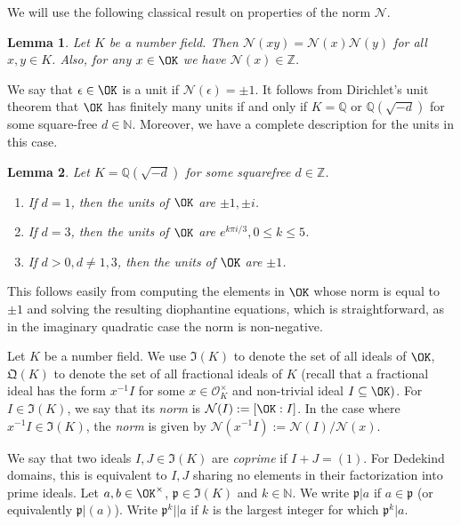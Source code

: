 \documentclass[11pt]{amsart}
\newtheorem{lemma}{Lemma}[section]
\theoremstyle{definition}
\newcommand{\N}{{\mathbb N}}
\newcommand{\NN}{{\mathcal N}}
\newcommand{\Q}{{\mathbb Q}}
\newcommand{\Z}{{\mathbb Z}}
\newcommand{\mf}{\mathfrak}
\newcommand{\e}{\epsilon}
\begin{document}
We will use the following classical result on properties of the norm $\NN$.

\begin{lemma}
    Let $K$ be a number field. Then $\NN(xy)=\NN(x)\NN(y)$ for all $x,y\in K$. Also, for any $x \in \OK$ we have $\NN(x)\in\Z$.
\end{lemma}

We say that $\e\in \OK$ is a unit if $\NN(\e)=\pm 1$. 
It follows from Dirichlet's unit theorem \cite[Theorem~8.1]{neukirch99} that $\OK$ has finitely many units if and only if $K=\Q$ or $\Q(\sqrt{-d})$ for some square-free $d\in\N$. Moreover, 
we have a complete description for the units in this case.

\begin{lemma}\label{l32}
    Let $K=\Q(\sqrt{-d})$ for some squarefree $d\in\Z$. 
    \begin{enumerate}
        \item If $d=1$, then the units of $\OK$ are $\pm 1, \pm i$.
        \item If $d=3$, then the units of $\OK$ are $e^{k\pi i/3}, 0\leq k\leq 5$.
        \item If $d>0, d\neq 1,3$, then the units of $\OK$ are $\pm 1$.
    \end{enumerate}
\end{lemma}
This follows easily from computing the elements in $\OK$ whose norm is equal to $\pm 1$ and solving the resulting diophantine equations, which is straightforward, as in the imaginary quadratic case the norm is non-negative. 


 

Let $K$ be a number field. We use $\mathfrak{I}(K)$ to denote the set of all  ideals of $\OK$, $\mathfrak{Q}(K)$ to denote the set of all fractional ideals of $K$ (recall that a fractional ideal has the form $x^{-1}I$ for some $x \in \mathcal{O}_K^{\times}$ and non-trivial ideal $I \subseteq \OK)$. %
For $I\in \mathfrak{I}(K)$, we say that its \emph{norm} is $\NN(I):=[\OK:I]$. In the case where $x^{-1}I\in \mathfrak{I}(K)$, the \emph{norm} is given by $\NN(x^{-1}I):=\NN(I)/\NN(x)$.

We say that two ideals $I, J \in \mf I(K)$ are \emph{coprime} if $I+J=(1)$. For Dedekind domains, this is equivalent to $I,J$ sharing no elements in their factorization into prime ideals.
 Let $a,b\in\OK^{\times}$, $\mf p\in \mf I(K)$ and $k\in\N$. We write $\mf p\vert a$ if $a\in\mf p$ (or equivalently $\mf p\vert (a)$). Write $\mf p^{k}|| a$ if $k$ is the largest integer for which $\mf p^{k}\vert a$. 
 
\end{document}
